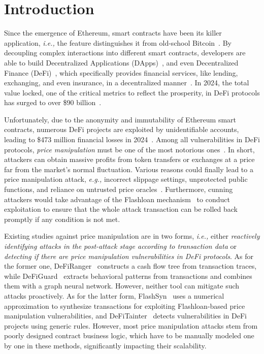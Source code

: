 \section{Introduction}


Since the emergence of Ethereum, smart contracts have been its killer application, \textit{i.e.,} the feature distinguishes it from old-school Bitcoin~\cite{nakamoto2008bitcoin}.
By decoupling complex interactions into different smart contracts, developers are able to build Decentralized Applications (DApps)~\cite{raval2016decentralized}, and even Decentralized Finance (DeFi)~\cite{zetzsche2020decentralized}, which specifically provides financial services, like lending, exchanging, and even insurance, in a decentralized manner~\cite{shah2023systematic}.
In 2024, the total value locked, one of the critical metrics to reflect the prosperity, in DeFi protocols has surged to over \$90 billion~\cite{biance_re}.


Unfortunately, due to the anonymity and immutability of Ethereum smart contracts, numerous DeFi projects are exploited by unidentifiable accounts, leading to \$473 million financial losses in 2024~\cite{coindesk}.
Among all vulnerabilities in DeFi protocols, \textit{price manipulation} must be one of the most notorious ones~\cite{zhang2023demystifying}. In short, attackers can obtain massive profits from token transfers or exchanges at a price far from the market's normal fluctuation.
Various reasons could finally lead to a price manipulation attack, \textit{e.g.,} incorrect slippage settings, unprotected public functions, and reliance on untrusted price oracles~\cite{mo2023toward}. Furthermore, cunning attackers would take advantage of the Flashloan mechanism~\cite{qin2021attacking} to conduct exploitation to ensure that the whole attack transaction can be rolled back promptly if any condition is not met. 


Existing studies against price manipulation are in two forms, \textit{i.e.,} either \textit{reactively identifying attacks in the post-attack stage according to transaction data} or \textit{detecting if there are price manipulation vulnerabilities in DeFi protocols}.
As for the former one, DeFiRanger~\cite{wu2023defiranger} constructs a cash flow tree from transaction traces, while DeFiGuard~\cite{wang2024defiguard} extracts behavioral patterns from transactions and combines them with a graph neural network. However, neither tool can mitigate such attacks proactively.
As for the latter form, FlashSyn~\cite{chen2024flashsyn} uses a numerical approximation to synthesize transactions for exploiting Flashloan-based price manipulation vulnerabilities, and DeFiTainter~\cite{kong2023defitainter} detects vulnerabilities in DeFi projects using generic rules.
However, most price manipulation attacks stem from poorly designed contract business logic, which have to be manually modeled one by one in these methods, significantly impacting their scalability.

